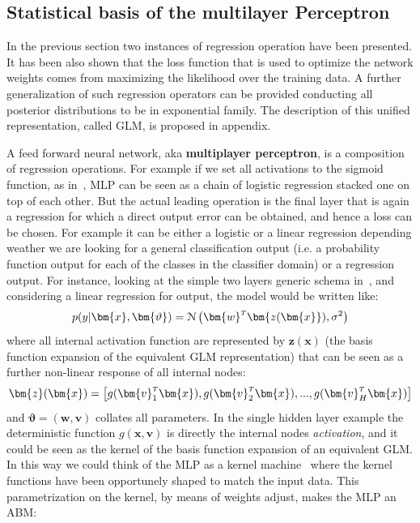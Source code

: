 \subsection{Statistical basis of the multilayer Perceptron}
\label{section:feedforward dense networks}

In the previous section two instances of regression operation have been presented. It has been also shown that the loss function that is used to optimize the network weights comes from maximizing the likelihood over the training data.
A further generalization of such regression operators can be provided conducting all posterior distributions to be in exponential family. The description of this unified representation, called \ac{GLM}, is proposed in appendix.

A feed forward neural network, aka \textbf{multiplayer perceptron}, is a composition of regression operations. For example if we set all activations to the sigmoid function, as in~\Figure{\ref{fig:mlp_b}}, \acs{MLP} can be seen as a chain of logistic regression stacked one on top of each other. But the actual leading operation is the final layer that is again a regression for which a direct output error can be obtained, and hence a loss can be chosen. For example it can be either a logistic or a linear regression depending weather we are looking for a general classification output (i.e. a probability function output for each of the classes in the classifier domain) or a regression output. 
For instance, looking at the simple two layers generic schema in~\Figure{\ref{fig:generic_mlp_a}}, and considering a linear regression for output, the model would be written like:
\begin{equation}
    p(y|\bm{x},\bm{\vartheta}) = \mathcal{N}\left(\transpose{\bm{w}}\bm{z(\bm{x}}), \sigma^2 \right)
    \label{eq:mlp_a}
\end{equation}
where all internal activation function are represented by $\bm{z}(\bm{x})$ (the basis function expansion of the equivalent \acs{GLM} representation) that can be seen as a further non-linear response of all internal nodes:
\begin{equation}
    \bm{z}(\bm{x}) = \left[ g(\transpose{\bm{v}_1}\bm{x}), g(\transpose{\bm{v}_2}\bm{x}), ..., g(\transpose{\bm{v}_H}\bm{x})
    \right]
    \label{eq:mlp_b}
\end{equation}
and $\bm{\vartheta} = (\bm{w},\bm{v})$ collates all parameters.
In the single hidden layer example the deterministic function $g(\bm{x},\bm{v})$ is directly the internal nodes \textit{activation}, and it could be seen as the kernel of the basis function expansion of an equivalent \acs{GLM}. In this way we could think of the \acl{MLP} as a kernel machine~\cite{Scholkopf:1999:AKM:299094} where the kernel functions have been opportunely shaped to match the input data. This parametrization on the kernel, by means of weights adjust,  makes the \acl{MLP} an \ac{ABM}:
